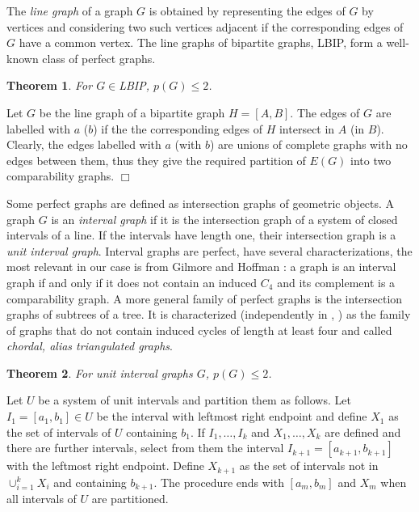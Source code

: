 \documentclass[12pt]{article}
\newtheorem{theorem}{Theorem}%
\def\qed{\ifhmode\unskip\nobreak\fi\quad\ifmmode\Box\else$\Box$\fi}
\def\qed{\hfill $\Box$}
\begin{document}
The {\em line graph} of a graph $G$ is obtained by representing the edges of $G$ by vertices and
considering two such vertices adjacent if the corresponding edges of $G$ have a common vertex.
The line graphs of bipartite graphs, LBIP, form a well-known class of perfect graphs.

\begin{theorem}\label{bipline} For $G\in $LBIP, $p(G)\le 2$.
\end{theorem}


\medskip

  Let $G$ be the line graph of a bipartite graph $H=[A,B]$.
The edges of $G$ are labelled with $a$ ($b$) if the the corresponding edges of $H$ intersect in $A$ (in $B$).
Clearly, the edges labelled with $a$ (with $b$) are unions of complete graphs with no edges between them,
thus they give the required partition of $E(G)$ into two comparability graphs. \qed

\medskip
Some perfect graphs are defined as intersection graphs of geometric objects.
A graph $G$ is an {\em interval graph} if it is the intersection graph of a system of closed intervals of a line.
If the intervals have length one, their intersection graph is a {\em unit interval graph}.
Interval graphs are perfect, have several characterizations, the most relevant in our case is from Gilmore and Hoffman \cite{GH}:
a graph is an interval graph if and only if it does not contain an induced $C_4$ and its complement is a comparability graph.
A more general family of perfect graphs is the intersection graphs of subtrees of a tree.
It is characterized (independently in \cite{GAV}, \cite{WA}) as the family of graphs that do
not contain induced cycles of length at least four and called {\em chordal, alias triangulated graphs}.


\begin{theorem}\label{unit} For unit interval graphs $G$, $p(G)\le 2$.
\end{theorem}


  Let $U$ be a system of unit intervals and partition them as follows.
Let $I_1=[a_1,b_1] \in U$ be the interval with leftmost right endpoint and define $X_1$ as the set of intervals of
$U$ containing $b_1$.
If $I_1,\dots, I_k$ and $X_1,\dots,X_k$ are defined and there are further intervals, select from them the interval $I_{k+1}=[a_{k+1},b_{k+1}]$
with the leftmost right endpoint.
Define $X_{k+1}$ as the set of intervals not in $\cup_{i=1}^k X_i$ and containing $b_{k+1}$.
The procedure ends with $[a_m,b_m]$ and $X_m$ when all intervals of $U$ are partitioned.
\end{document}
